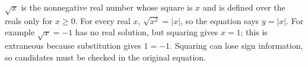 $\sqrt{x}$ is the nonnegative real number whose square is $ x $ and is defined over the reals only for $ x\ge0 $. For every real $ x $, $\sqrt{x^2}=|x|$, so the equation says $ y=|x|$. For example $\sqrt{x}=-1 $ has no real solution, but squaring gives $ x=1 $; this is extraneous because substitution gives $ 1=-1 $. Squaring can lose sign information, so candidates must be checked in the original equation.
